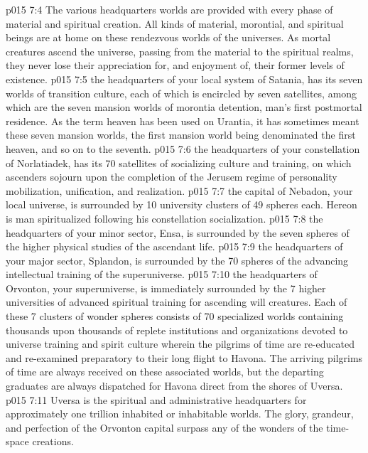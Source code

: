 \vs p015 7:4 The various headquarters worlds are provided with every phase of material and spiritual creation. All kinds of material, morontial, and spiritual beings are at home on these rendezvous worlds of the universes. As mortal creatures ascend the universe, passing from the material to the spiritual realms, they never lose their appreciation for, and enjoyment of, their former levels of existence.
\vs p015 7:5 \pc {} the headquarters of your local system of Satania, has its seven worlds of transition culture, each of which is encircled by seven satellites, among which are the seven mansion worlds of morontia detention, man’s first postmortal residence. As the term heaven has been used on Urantia, it has sometimes meant these seven mansion worlds, the first mansion world being denominated the first heaven, and so on to the seventh.
\vs p015 7:6 \pc {} the headquarters of your constellation of Norlatiadek, has its 70 satellites of socializing culture and training, on which ascenders sojourn upon the completion of the Jerusem regime of personality mobilization, unification, and realization.
\vs p015 7:7 \pc {} the capital of Nebadon, your local universe, is surrounded by 10 university clusters of 49 spheres each. Hereon is man spiritualized following his constellation socialization.
\vs p015 7:8 \pc {} the headquarters of your minor sector, Ensa, is surrounded by the seven spheres of the higher physical studies of the ascendant life.
\vs p015 7:9 \pc {} the headquarters of your major sector, Splandon, is surrounded by the 70 spheres of the advancing intellectual training of the superuniverse.
\vs p015 7:10 \pc {} the headquarters of Orvonton, your superuniverse, is immediately surrounded by the 7 higher universities of advanced spiritual training for ascending will creatures. Each of these 7 clusters of wonder spheres consists of 70 specialized worlds containing thousands upon thousands of replete institutions and organizations devoted to universe training and spirit culture wherein the pilgrims of time are re\hyp{}educated and re\hyp{}examined preparatory to their long flight to Havona. The arriving pilgrims of time are always received on these associated worlds, but the departing graduates are always dispatched for Havona direct from the shores of Uversa.
\vs p015 7:11 Uversa is the spiritual and administrative headquarters for approximately one trillion inhabited or inhabitable worlds. The glory, grandeur, and perfection of the Orvonton capital surpass any of the wonders of the time\hyp{}space creations.
